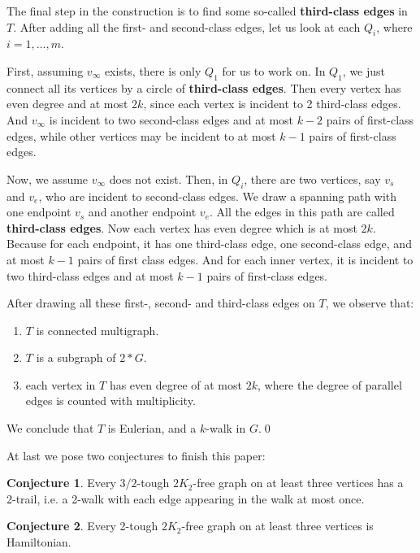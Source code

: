 \documentclass{amsart}
\theoremstyle{definition}
\newtheorem{conjecture}{Conjecture}
\begin{document}
The final step in the construction is to find some so-called {\bf third-class edges} in $T$. After adding all the first- and second-class edges, let us look at each $Q_i$, where $i=1,\ldots,m$.

First, assuming $v_{\infty}$ exists, there is only $Q_1$ for us to work on. In $Q_1$, we just connect all its vertices by a circle of {\bf third-class edges}. Then every vertex has even degree and at most $2k$, since each vertex is incident to 2 third-class edges. And $v_{\infty}$ is incident to two second-class edges and at most $k-2$ pairs of first-class edges, while other vertices may be incident to at most $k-1$ pairs of first-class edges.

Now, we assume $v_{\infty}$ does not exist. Then, in $Q_i$, there are two vertices, say $v_s$ and $v_e$, who are incident to second-class edges. We draw a spanning path with one endpoint $v_s$ and another endpoint $v_e$. All the edges in this path are called {\bf third-class edges}.
Now each vertex has even degree which is at most $2k$. Because for each endpoint, it has one third-class edge, one second-class edge, and at most $k-1$ pairs of first class edges. And for each inner vertex, it is incident to two third-class edges and at most $k-1$ pairs of first-class edges.



After drawing all these first-, second- and third-class edges on $T$, we observe that:
\begin{enumerate}
\item $T$ is connected multigraph.
\item $T$ is a subgraph of $2*G$.
\item each vertex in $T$ has even degree of at most $2k$, where the degree of parallel edges is counted with multiplicity.
\end{enumerate}
We conclude that $T$ is Eulerian, and a $k$-walk in $G$.\qed



At last we pose two conjectures to finish this paper:


\begin{conjecture}
Every $3/2$-tough $2K_2$-free graph on at least three vertices has a 2-trail, i.e. a 2-walk with each edge appearing in the walk at most once.
\end{conjecture}


\begin{conjecture}
Every 2-tough $2K_2$-free graph on at least three vertices is Hamiltonian.
\end{conjecture}



























\end{document}
